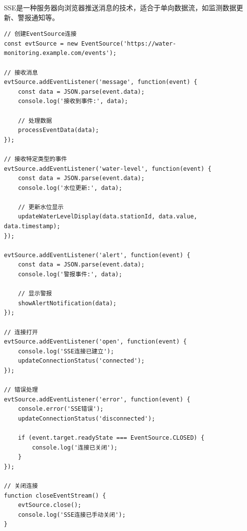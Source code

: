 SSE是一种服务器向浏览器推送消息的技术，适合于单向数据流，如监测数据更新、警报通知等。

\begin{lstlisting}
// 创建EventSource连接
const evtSource = new EventSource('https://water-monitoring.example.com/events');

// 接收消息
evtSource.addEventListener('message', function(event) {
    const data = JSON.parse(event.data);
    console.log('接收到事件:', data);
    
    // 处理数据
    processEventData(data);
});

// 接收特定类型的事件
evtSource.addEventListener('water-level', function(event) {
    const data = JSON.parse(event.data);
    console.log('水位更新:', data);
    
    // 更新水位显示
    updateWaterLevelDisplay(data.stationId, data.value, data.timestamp);
});

evtSource.addEventListener('alert', function(event) {
    const data = JSON.parse(event.data);
    console.log('警报事件:', data);
    
    // 显示警报
    showAlertNotification(data);
});

// 连接打开
evtSource.addEventListener('open', function(event) {
    console.log('SSE连接已建立');
    updateConnectionStatus('connected');
});

// 错误处理
evtSource.addEventListener('error', function(event) {
    console.error('SSE错误');
    updateConnectionStatus('disconnected');
    
    if (event.target.readyState === EventSource.CLOSED) {
        console.log('连接已关闭');
    }
});

// 关闭连接
function closeEventStream() {
    evtSource.close();
    console.log('SSE连接已手动关闭');
}
\end{lstlisting}
